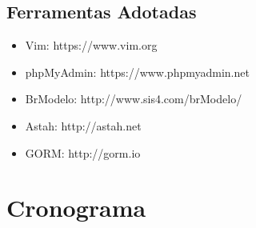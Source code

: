 \documentclass[12pt]{article}
\begin{document}
\subsection{Ferramentas Adotadas}

\begin{itemize}
	\item Vim: https://www.vim.org
	\item phpMyAdmin: https://www.phpmyadmin.net
	\item BrModelo: http://www.sis4.com/brModelo/
	\item Astah: http://astah.net
	\item GORM: http://gorm.io
\end{itemize}

\newpage

\section{Cronograma}
\end{document}
